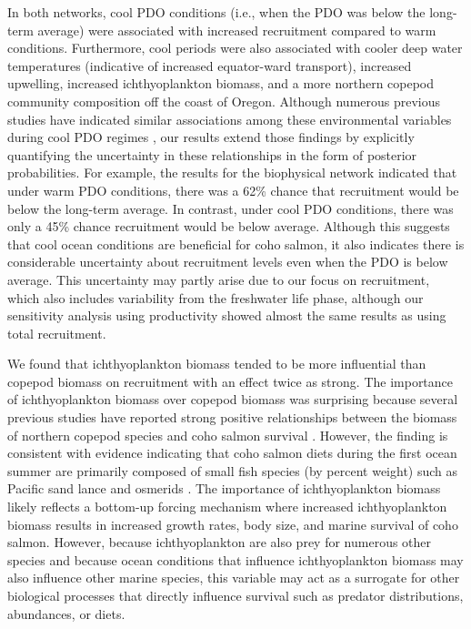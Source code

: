 In both networks, cool PDO conditions (i.e., when the PDO was below the
long-term average) were associated with increased recruitment compared to warm
conditions. Furthermore, cool periods were also associated with cooler deep
water temperatures (indicative of increased equator-ward transport), increased
upwelling, increased ichthyoplankton biomass, and a more northern copepod
community composition off the coast of Oregon.  Although numerous previous
studies have indicated similar associations among these environmental variables
during cool PDO regimes \citep{King2011, Peterson2003b, Keister2011a,
Mantua1997a}, our results extend those findings by explicitly quantifying the
uncertainty in these relationships in the form of posterior probabilities. For
example, the results for the biophysical network indicated that under warm PDO
conditions, there was a 62\% chance that recruitment would be below the
long-term average. In contrast, under cool PDO conditions, there was only a 45\%
chance recruitment would be below average. Although this suggests that cool
ocean conditions are beneficial for coho salmon, it also indicates there is
considerable uncertainty about recruitment levels even when the PDO is below
average. This uncertainty may partly arise due to our focus on recruitment,
which also includes variability from the freshwater life phase, although our
sensitivity analysis using productivity showed almost the same results as using
total recruitment.

We found that ichthyoplankton biomass tended to be more influential than copepod
biomass on recruitment with an effect twice as strong. The importance of
ichthyoplankton biomass over copepod biomass was surprising because several
previous studies have reported strong positive relationships between the biomass
of northern copepod species and coho salmon survival \citep{Bi2011a,
Ruzicka2011, Peterson2003b}.  However, the finding is consistent with evidence
indicating that coho salmon diets during the first ocean summer are primarily
composed of small fish species (by percent weight) such as Pacific sand lance
and osmerids \citep{Brodeur2007a, Weitkamp2008a}. The importance of
ichthyoplankton biomass likely reflects a bottom-up forcing mechanism where
increased ichthyoplankton biomass results in increased growth rates, body size,
and marine survival of coho salmon. However, because ichthyoplankton are also
prey for numerous other species \citep{Gladics2014, Miller2010, Miller2007} and
because ocean conditions that influence ichthyoplankton biomass may also
influence other marine species, this variable may act as a surrogate for other
biological processes that directly influence survival such as predator
distributions, abundances, or diets.


